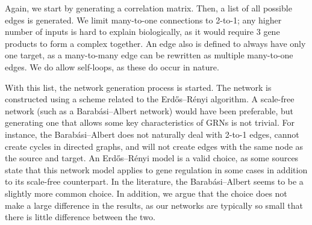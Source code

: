 \documentclass[../main.tex]{subfiles}
\begin{document}
Again, we start by generating a correlation matrix. Then, a list of all possible edges is generated.
We limit many-to-one connections to 2-to-1; any higher number of inputs is hard to explain biologically, as it would require 3 gene products to form a complex together.
An edge also is defined to always have only one target, as a many-to-many edge can be rewritten as multiple many-to-one edges.
We do allow self-loops, as these do occur in nature.

With this list, the network generation process is started.
The network is constructed using a scheme related to the Erdős–Rényi algorithm.
A scale-free network (such as a Barabási–Albert network) would have been preferable, but generating one that allows some key characteristics of GRNs is not trivial.
For instance, the Barabási–Albert does not naturally deal with 2-to-1 edges, cannot create cycles in directed graphs, and will not create edges with the same node as the source and target.
An Erdős–Rényi model is a valid choice, as some sources state that this network model applies to gene regulation in some cases in addition to its scale-free counterpart.
In the literature, the Barabási–Albert seems to be a slightly more common choice.
In addition, we argue that the choice does not make a large difference in the results, as our networks are typically so small that there is little difference between the two.
\end{document}
